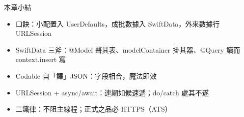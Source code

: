 \begin{tcbsummary}{本章小結}
\begin{itemize}
  \item 口訣：小配置入 UserDefaults，成批數據入 SwiftData，外來數據行 URLSession
  \item SwiftData 三斧：@Model 聲其表、modelContainer 掛其器、@Query 讀而 context.insert 寫
  \item Codable 自「譯」JSON：字段相合，魔法即效
  \item URLSession + async/await：連網如候速遞；do/catch 處其不遂
  \item 二鐵律：不阻主線程；正式之品必 HTTPS（ATS）
\end{itemize}

\end{tcbsummary}
